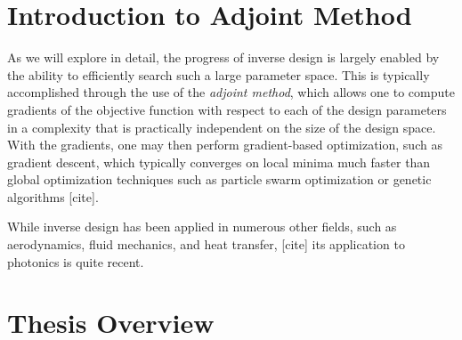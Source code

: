 
\section{Introduction to Adjoint Method}

As we will explore in detail, the progress of inverse design is largely enabled by the ability to efficiently search such a large parameter space.
This is typically accomplished through the use of the \textit{adjoint method}, which allows one to compute gradients of the objective function with respect to each of the design parameters in a complexity that is practically independent on the size of the design space.
With the gradients, one may then perform gradient-based optimization, such as gradient descent, which typically converges on local minima much faster than global optimization techniques such as particle swarm optimization or genetic algorithms [cite].


While inverse design has been applied in numerous other fields, such as aerodynamics, fluid mechanics, and heat transfer, [cite] its application to photonics is quite recent.

\section{Thesis Overview}

